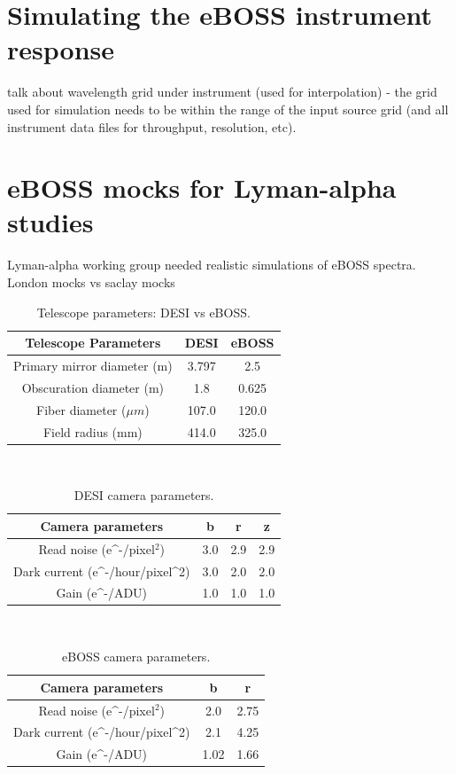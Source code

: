 \section{Simulating the eBOSS instrument response}

talk about wavelength grid under instrument (used for interpolation) - the grid used for simulation needs to be within the range of the input source grid (and all instrument data files for throughput, resolution, etc).  

\section{eBOSS mocks for Lyman-alpha studies}

Lyman-alpha working group needed realistic simulations of eBOSS spectra. London mocks vs saclay mocks


\begin{table}
\caption{Telescope parameters: DESI vs eBOSS.}
\label{tab:comparison}
\centering
\begin{tabular}{|c|c|c|}
  \hline
  Telescope Parameters & DESI & eBOSS\\
  \hline \hline
  Primary mirror diameter (m) & 3.797 & 2.5 \\
  \hline
  Obscuration diameter (m) & 1.8 & 0.625 \\
  \hline
  Fiber diameter ($\mu m$) & 107.0 & 120.0 \\
  \hline
  Field radius (mm) & 414.0 & 325.0 \\
  \hline
\end{tabular}
\end{table}\\

\begin{table}
\caption{DESI camera parameters.}
\label{tab:desicam}
\centering
\begin{tabular}{|c|c|c|c|}
  \hline
  Camera parameters & b & r & z\\
  \hline \hline
  Read noise (e^{-}/pixel$^{2}$) & 3.0 & 2.9 & 2.9 \\
  \hline
  Dark current (e^{-}/hour/pixel^{2}) & 3.0 & 2.0 & 2.0 \\
  \hline
  Gain (e^{-}/ADU) & 1.0 & 1.0 & 1.0\\
  \hline
\end{tabular}
\end{table}\\

\begin{table}
\caption{eBOSS camera parameters.}
\label{tab:ebosscam}
\centering
\begin{tabular}{|c|c|c|}
  \hline
  Camera parameters & b & r\\
  \hline \hline
  Read noise (e^{-}/pixel$^{2}$) & 2.0 & 2.75 \\
  \hline
  Dark current (e^{-}/hour/pixel^{2}) & 2.1 & 4.25 \\
  \hline
  Gain (e^{-}/ADU) & 1.02 & 1.66\\
  \hline
\end{tabular}
\end{table}\\

